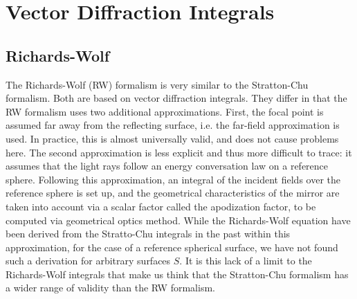 \documentclass[11pt,SymmetricalJury]{inrsthesis/inrsthesis}
\begin{document}


\section{Vector Diffraction Integrals}

\subsection{Richards-Wolf}

The Richards-Wolf (RW) formalism is very similar to the Stratton-Chu formalism.
Both are based on vector diffraction integrals. They differ in that the RW
formalism uses two additional approximations. First, the focal point is assumed
far away from the reflecting surface, i.e. the far-field approximation is used.
In practice, this is almost universally valid, and does not cause problems here.
The second approximation is less explicit and thus more difficult to trace: it
assumes that the light rays follow an energy conversation law on a reference
sphere. Following this approximation, an integral of the incident fields over
the reference sphere is set up, and the geometrical characteristics of the
mirror are taken into account via a scalar factor called the apodization factor,
to be computed via geometrical optics method. While the Richards-Wolf equation
have been derived from the Stratto-Chu integrals in the past \cite{Sheppard1977}
within this approximation, for the case of a reference spherical surface, we
have not found such a derivation for arbitrary surfaces $S$. It is this lack of
a limit to the Richards-Wolf integrals that make us think that the Stratton-Chu
formalism has a wider range of validity than the RW formalism.
\end{document}
